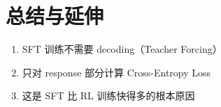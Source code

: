 \section{总结与延伸}
\begin{enumerate}
  \item SFT 训练不需要 decoding（Teacher Forcing）
  \item 只对 response 部分计算 Cross-Entropy Loss
  \item 这是 SFT 比 RL 训练快得多的根本原因
\end{enumerate}


